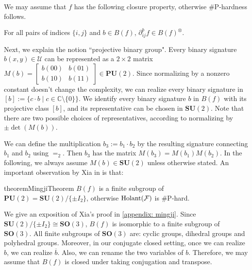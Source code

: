 We may assume that $f$ has the following closure property, otherwise \#P-hardness follows.
\begin{proposition}[$B(f)$ closure]\label{prop: binary closure}
    For all pairs of indices $\{i,j\}$ and $b\in B(f)$, $\partial^b_{ij}f\in B(f)^{\otimes}$.
\end{proposition}

Next, we explain the notion ``projective binary group".
Every binary signature $b(x,y)\in \mathcal{U}$ can be represented as a $2\times 2$ matrix $M(b)=\left[\begin{smallmatrix}
    b(00) & b(01)\\
    b(10) & b(11)
\end{smallmatrix}\right]\in \mathbf{PU}(2)$.
Since normalizing by a nonzero constant doesn't change the complexity, we can realize every binary signature in $[b]:=\{c\cdot b\mid c\in \mathbb{C}\setminus\{0\}\}.$
We identify every binary signature $b$ in $B(f)$ with its projective class $[b]$, and its representative can be chosen in $\mathbf{SU}(2).$ 
Note that there are two possible choices of representatives, according to normalizing by $\pm\det(M(b))$.

We can define the multiplication $b_3:=b_1\cdot b_2$ by the resulting signature connecting $b_1$ and $b_2$ using $=_2$.
Then $b_3$ has the matrix $M(b_3)=M(b_1)M(b_2)$.
In the following, we always assume $M(b)\in \mathbf{SU}(2)$ unless otherwise stated.
An important observation by Xia in \cite{MingjiProgram} is that:

\begin{restatable}{theorem}{MingjiTheorem}\label{thm: binary set is finite group}
    $B(f)$ is %
    a finite subgroup of $\mathbf{PU}(2)=\mathbf{SU}(2)/\{\pm I_2\}$, otherwise $\operatorname{Holant}(\mathcal{F})$ is \#P-hard.
\end{restatable}
We give an exposition of Xia's proof in \autoref{appendix: mingji}.
Since $\mathbf{SU}(2)/\{\pm I_2\}\cong\mathbf{SO}(3)$, $B(f)$ is isomorphic to a finite subgroup of $\mathbf{SO}(3).$
All finite subgroups of $\mathbf{SO}(3)$ are: cyclic groups, dihedral groups and polyhedral groups.
Moreover, in our conjugate closed setting, once we can realize $b$, we can realize $\overline{b}$.
Also, we can rename the two variables of $b$.
Therefore, we may assume that $B(f)$ is closed under taking conjugation and transpose.

